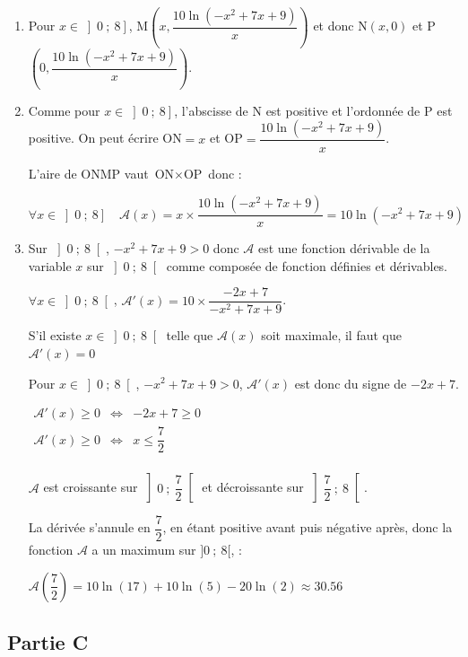 \documentclass[10pt]{article}
\providecommand{\np}[2][]{{#2~#1}}
\begin{document}
\begin{enumerate}
	\item Pour $x\in \left]0~;~8\right]$, M$\left(x,\dfrac{10\ln\left(-x^2 + 7x + 9\right)}{x}\right)$ et donc N$\left(x,0\right)$ et P$\left(0,\dfrac{10\ln\left(-x^2 + 7x + 9\right)}{x}\right)$.
	\item Comme pour $x\in \left]0~;~8\right]$, l'abscisse de N est positive et l'ordonnée de P est positive. On peut écrire ON$=x$ et OP$=\dfrac{10\ln\left(-x^2 + 7x + 9\right)}{x}$.
	
	L'aire de ONMP vaut $\text{ON}\times\text{OP}$ donc : 
	
	$\forall x \in \left]0~;~8\right]\quad \mathcal{A}(x) = x\times \dfrac{10\ln\left(-x^2 + 7x + 9\right)}{x} = 10\ln\left(-x^2 + 7x + 9\right)$
	\item Sur $\left]0~;~8\right[$, $-x^2 + 7x + 9 > 0$ donc $\mathcal{A}$ est une fonction dérivable de la variable $x$ sur $\left]0~;~8\right[$ comme composée de fonction définies et dérivables. 
	
	$\forall x\in \left]0~;~8\right[$, $\mathcal{A}'(x) = 10\times \dfrac{-2x + 7}{-x^2 + 7x +9}$.
	
	S'il existe $x\in \left]0~;~8\right[$ telle que $\mathcal{A}(x)$ soit maximale, il faut que $\mathcal{A}'(x) = 0$
	
	Pour $x\in \left]0~;~8\right[$, $-x^2 + 7x +9 > 0 $,  $\mathcal{A}'(x)$ est donc du signe de $-2x + 7$.
	
	$
	\begin{array}{ccc}
	\mathcal{A}'(x) \geqslant 0 &\iff& -2x + 7 \geqslant 0 \\
	\mathcal{A}'(x) \geqslant 0 &\iff& x \leqslant \dfrac{7}{2} \\
	\end{array}
	$

	$\mathcal{A}$ est croissante sur $\left]0~;~\dfrac{7}{2}\right[$ et décroissante sur  $\left]\dfrac{7}{2}~;~8\right[$.
	
	La dérivée s'annule en $\dfrac{7}{2}$, en étant positive avant puis négative après, donc la fonction $\mathcal{A}$ a un maximum sur $]0~;~8[$, : 
	
	$\mathcal{A}\left(\dfrac{7}{2}\right) = 10\ln(17)+ 10\ln(5)-20\ln(2) \approx \np{30.56}$
	
	\end{enumerate}
	
\subsection*{Partie C}
\end{document}
